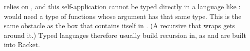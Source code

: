 \begin{remark}
 relies on , and this self-application cannot be typed directly in a language like :  would need a type of functions whose argument has that same type. This is the same obstacle as the box that contains itself in . (A recursive  that wraps  gets around it.) Typed languages therefore usually build recursion in, as  and  are built into Racket.
\end{remark}
